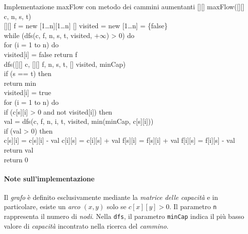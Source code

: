 \begin{minicode}{Implementazione maxFlow con metodo dei cammini aumentanti}
\ind{}[][] maxFlow([][] c,  n,  s,  t)\\
    [][] f = new [1\dots n][1\dots n]\hfill{}
    [] visited = new [1\dots n] = \{false\}\\
    \indf while (dfs(c, f, n, s, t, visited, $+\infty$) > 0) do\\
        \indff for (i = 1 to n) do\\
            visited[i] = false\hfill{}
    \indf return f\\

\nl{}
\rmindent\ind{} dfs([][] c, [][] f,   n,  s,
     t, [] visited, \:minCap)\\
    \indf if (s == t) then\\
        return min\\
    \indf visited[i] = true\\
    \indf for (i = 1 to n) do\\
        \indff if (c[s][i] > 0 and not visited[i]) then\\
             val = dfs(c, f, n, i, t, visited, min(minCap, c[s][i]))\\
            \indfff if (val > 0) then\\
                c[s][i] = c[s][i] - val\hfill{}
                c[i][s] = c[i][s] + val\hfill{}
                f[s][i] = f[s][i] + val\hfill{}
                f[i][s] = f[i][s] - val\hfill{}
                return val\\
    \indf return 0\hfill{}
\end{minicode}

\paragraph{Note sull'implementazione}
Il \emph{grafo} è definito esclusivamente mediante la \emph{matrice delle
capacità} e in particolare, esiste un \emph{arco} $(x,y)$ solo se $c[x][y]>0$.
Il parametro \texttt{n} rappresenta il numero di \emph{nodi}. Nella
\texttt{dfs}, il parametro \texttt{minCap} indica il più basso valore di
\emph{capacità} incontrato nella ricerca del \emph{cammino}.


